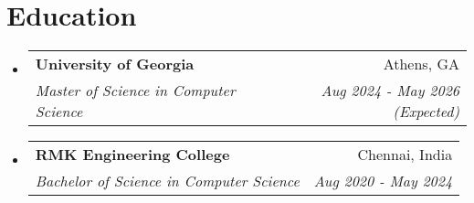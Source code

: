 \documentclass[letterpaper,10pt]{article}
\makeatletter
\newcommand{\resumeItem}[1]{
  \item\small{
    {#1 \vspace{-5pt}}
  }
}
\newcommand{\resumeSubheading}[4]{
  \vspace{-1.5pt}\item
    \begin{tabular*}{0.97\textwidth}{l@{\extracolsep{\fill}}r}
      \textbf{#1} & #2 \\
      \textit{\small#3} & \textit{\small #4} \\
    \end{tabular*}\vspace{-6pt}
}
\newcommand{\resumePublicationsHeading}[2]{
    \item
    \begin{tabular*}{0.97\textwidth}{l@{\extracolsep{\fill}}r}
      \small#1 & #2 \\
    \end{tabular*}\vspace{-6pt}
}
\newcommand{\resumeSubHeadingListStart}{\begin{itemize}[leftmargin=*]}
\newcommand{\resumeSubHeadingListEnd}{\end{itemize}}
\newcommand{\resumeItemListStart}{\begin{itemize}}
\newcommand{\resumeItemListEnd}{\end{itemize}\vspace{-6pt}}
\makeatother
\begin{document}
\section{Education}
  \resumeSubHeadingListStart
    \resumeSubheading
      {University of Georgia}{Athens, GA}
      {Master of Science in Computer Science}{Aug 2024 - May 2026 (Expected)}
    \resumeSubheading
      {RMK Engineering College}{Chennai, India}
      {Bachelor of Science in Computer Science}{Aug 2020 - May 2024}
  \resumeSubHeadingListEnd

\end{document}
